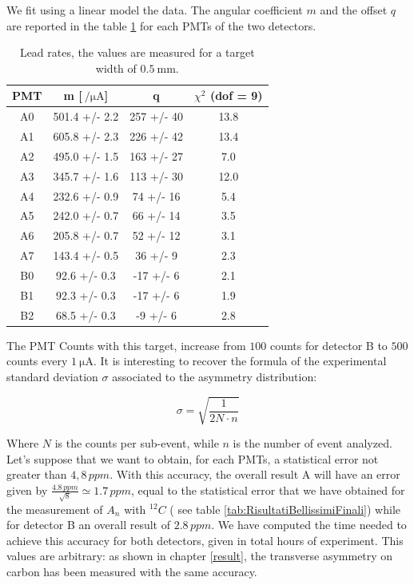 We fit using a linear model the data. The angular coefficient $m$ and the offset $q$ are reported in the table \ref{tab:LeadRates} for each PMTs of the two detectors.  

\begin{table}[ht]
\centering
\begin{tabular}{cccc}
\hline
 PMT   & m [$\SI{}{ \per \micro \ampere}$]          & q                &  $\chi^{2}$ (dof = 9) \\
\hline
 A0    & 501.4 +/- 2.2 & 257 +/- 40 & 13.8  \\
 A1    & 605.8 +/- 2.3 & 226 +/- 42 & 13.4  \\
 A2    & 495.0 +/- 1.5 & 163 +/- 27 &  7.0  \\
 A3    & 345.7 +/- 1.6  & 113 +/- 30  & 12.0 \\
 A4    & 232.6 +/- 0.9  & 74 +/- 16  &  5.4 \\
 A5    & 242.0 +/- 0.7 & 66 +/- 14  &  3.5  \\
 A6    & 205.8 +/- 0.7 & 52 +/- 12  &  3.1  \\
 A7    & 143.4 +/- 0.5 & 36 +/- 9   &  2.3  \\
 B0    & 92.6 +/- 0.3  & -17 +/- 6  &  2.1  \\
 B1    & 92.3 +/- 0.3  & -17 +/- 6   &  1.9  \\
 B2    & 68.5 +/- 0.3  & -9 +/- 6   &  2.8  \\
\hline
\end{tabular}
\caption{Lead rates, the values are measured for a target width of $\SI{0.5}{\milli \meter}$.}
\label{tab:LeadRates}
\end{table}

The PMT Counts with this target, increase from $100$ counts for detector B to $500$ counts every $\SI{1}{\micro \ampere}$. It is interesting to recover the formula of the experimental standard deviation $\sigma$ associated to the asymmetry distribution:

\begin{equation}
\sigma = \sqrt{\dfrac{1}{2 N \cdot n}}
\end{equation}

Where $N$ is the counts per sub-event, while  $n$ is the number of event analyzed.
Let's suppose that we want to obtain, for each PMTs, a statistical error not greater than $4,8 \, ppm$. With this accuracy, the overall result A will have an error given by $\frac{4.8 \, ppm}{\sqrt{8}} \simeq 1.7 \, ppm$, equal to the statistical error that we have obtained for the measurement of $A_{n}$ with $^{12}C$ ( see table \ref{tab:RisultatiBellissimiFinali}) while for detector B an overall result of $2.8 \, ppm$.
We have computed the time needed to achieve this accuracy for both detectors, given in total hours of experiment. This values are arbitrary: as shown in chapter \ref{result}, the transverse asymmetry on carbon has been measured with the same accuracy.  

